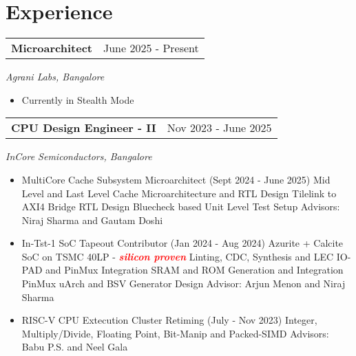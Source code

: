     \section{\sc Experience}

    \begin{tabular}{@{}p{4in}p{2in}}
        {\bf{Microarchitect}}  & June 2025 - Present \\
    \end{tabular}  
    \textit{Agrani Labs, Bangalore} 
    
    \begin{itemize}        
    \setlength\itemsep{0em}
        \item Currently in Stealth Mode
    \end{itemize}

    \begin{tabular}{@{}p{4in}p{2in}}
    {\bf{CPU Design Engineer - II}}  & Nov 2023 - June 2025 \\
    \end{tabular}  
    \textit{InCore Semiconductors, Bangalore} 

    \begin{itemize}
    \setlength\itemsep{0em}
    \item MultiCore Cache Subsystem Microarchitect (Sept 2024 - June 2025)
        \subitem Mid Level and Last Level Cache Microarchitecture and RTL Design 
        \subitem Tilelink to AXI4 Bridge RTL Design
        \subitem Bluecheck based Unit Level Test Setup
        \subitem Advisors: Niraj Sharma and Gautam Doshi     
    \item In-Tst-1 SoC Tapeout Contributor (Jan 2024 - Aug 2024)
    \subitem Azurite + Calcite SoC on TSMC 40LP 
    - {\bf \textcolor{red} {\textit{{silicon proven}}}} 
    \subitem Linting, CDC, Synthesis and LEC
    \subitem IO-PAD and PinMux Integration
    \subitem SRAM and ROM Generation and Integration
    \subitem PinMux uArch and BSV Generator Design
    \subitem Advisor: Arjun Menon and Niraj Sharma
    \item RISC-V CPU Extecution Cluster Retiming (July - Nov 2023)
    \subitem Integer, Multiply/Divide, Floating Point, Bit-Manip and Packed-SIMD
    \subitem Advisors: Babu P.S. and Neel Gala  
    \end{itemize}
    
